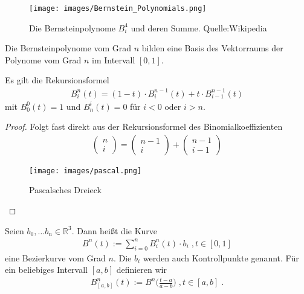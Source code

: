 \begin{figure}[H]
    \centering
    \texttt{[image: images/Bernstein\_Polynomials.png]}
    \caption{Die Bernsteinpolynome $B^{4}_i$ und deren Summe. Quelle:Wikipedia}
    \label{fig:bernstein-polynomial}
\end{figure}

\begin{Bemerkung}
Die Bernsteinpolynome vom Grad $n$ bilden eine Basis des Vektorraums der Polynome vom Grad $n$ im Intervall $[0,1]$.
\end{Bemerkung}

\begin{Satz}
Es gilt die Rekursionsformel
\begin{align*}
B_i^n(t) = (1-t) \cdot B^{n-1}_{i}(t) + t \cdot B^{n-1}_{i-1}(t)
\end{align*}
mit $B^0_0(t) = 1$ und $B^i_n(t) = 0$ für $i<0$ oder $i>n$.
\end{Satz}
\begin{proof}
Folgt fast direkt aus der Rekursionsformel des Binomialkoeffizienten
\begin{align*}
\begin{pmatrix} n \\ i \end{pmatrix} = \begin{pmatrix} n-1 \\ i \end{pmatrix} + \begin{pmatrix} n-1 \\ i-1 \end{pmatrix} 
\end{align*}
\begin{figure}[H]
    \centering
    \texttt{[image: images/pascal.png]}
    \caption{Pascalsches Dreieck}
    \label{fig:pascals-triangle}
\end{figure}
\end{proof}


\begin{Definition}
Seien $b_0, \hdots b_n \in \mathbb{R}^3$. Dann heißt die Kurve
\begin{align*}
B^n(t) := \sum_{i = 0}^{n} B_i^n(t) \cdot  b_i \; , t \in [0,1] 
\end{align*} 
eine Bezierkurve vom Grad $n$. Die $b_i$ werden auch Kontrollpunkte genannt.
Für ein beliebiges Intervall $[a,b]$ definieren wir
\begin{align*}
B^n_{[a,b]} (t):=  B^n\biggl( \frac{t-a }{a-b} \biggr) \; , t \in [a,b] \; .
\end{align*} 
\end{Definition}



